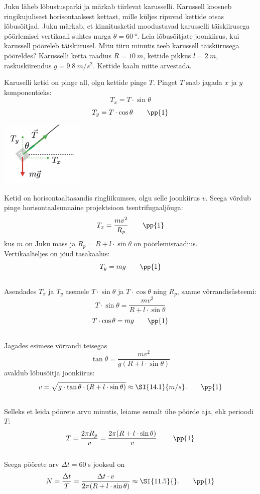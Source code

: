 \setAuthor{}

Juku läheb lõbustusparki ja märkab tiirlevat karusselli. Karussell koosneb ringikujulisest horisontaalsest kettast, mille küljes ripuvad kettide otsas lõbusõitjad. Juku märkab, et kinnitusketid moodustavad karusselli täiskiirusega pöörlemisel vertikaali suhtes nurga $\theta = \SI{60}{\degree}$.  Leia lõbusõitjate joonkiirus, kui karussell pööreleb täiskiirusel. Mitu tiiru minutis teeb karussell täiskiirusega pööreldes? Karusselli ketta raadius $R=\SI{10}{m}$, kettide pikkus $l=\SI{2}{m}$, raskuskiirendus $g=\SI{9,8}{m / s^2}$. Kettide kaalu mitte arvestada. 


\hint

\solu
Karuselli ketid on pinge all, olgu kettide pinge $T$. Pinget $T$ saab jagada $x$ ja $y$ komponentieks:  
$$T_x=T \cdot \sin{\theta}$$
$$T_y=T \cdot \cos{\theta} \qquad \pp{1} $$
 \begin{center}
\includegraphics[width=0.3\textwidth]{2020-v2g-02-yl.pdf}
\end{center}
Ketid on horisontaaltasandis ringliikumses, olgu selle joonkiirus $v$. Seega võrdub pinge horisontaalsunnaine projektsioon tsentrifugaaljõuga:
$$T_x = \frac{m v^2}{R_{p}}\quad\quad \pp{1}$$
kus $m$ on Juku mass ja $R_{p} = R + l \cdot \sin{\theta}$ on pöörlemisraadius.
\\
Vertikaalteljes on jõud tasakaalus:
$$T_y=mg \quad \quad \pp{1}$$ 
\\
Asendades $T_x$ ja $T_y$ asemele $T \cdot \sin{\theta}$ ja $T \cdot \cos{\theta}$ ning $R_{p}$, saame võrrandisüsteemi:
$$T \cdot \sin{\theta} = \frac{m v^2}{R + l \cdot \sin{\theta}}$$
$$T \cdot \cos{\theta} = mg \qquad \pp{1}$$ 
\\
Jagades esimese võrrandi teisegas
$$\tan{\theta}= \frac{mv^2}{g(R + l \cdot \sin{\theta})}$$
avaldub lõbusõitja joonkiirus:
$$v= \sqrt{g \cdot \tan{\theta} \cdot (R + l \cdot \sin{\theta})}\approx \SI{14.1}{m/s}. \qquad \pp{1}$$ 
\\
Selleks et leida pöörete arvu minutis, leiame esmalt ühe pöörde aja, ehk perioodi $T$:
$$T=\frac{2 \pi R_{p}}{v}=\frac{2 \pi (R + l \cdot \sin{\theta})}{v}. \qquad \pp{1}$$ 
\\
Seega pöörete arv  $\Delta t = 60\;$s jooksul on
$$N=\frac{\Delta t}{T} =\frac{\Delta t \cdot v}{2 \pi (R + l \cdot \sin{\theta})} \approx \SI{11.5}{}. \qquad \pp{1}$$
\probend